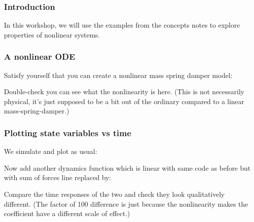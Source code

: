 \documentclass[9pt]{beamer-control}
\begin{document}

\begin{frame}
  \frametitle{Introduction}
  In this workshop, we will use the examples from the concepts notes to explore properties of nonlinear systems.
\end{frame}


\begin{frame}
  \frametitle{A nonlinear ODE}

  Satisfy yourself that you can create a nonlinear mass spring damper model:


  Double-check you can see what the nonlinearity is here. (This is not necessarily physical, it's just supposed to be a bit out of the ordinary compared to a linear mass-spring-damper.)

\end{frame}

\begin{frame}
  \frametitle{Plotting state variables vs time}
  We simulate and plot as usual:


  Now add another dynamics function which is linear with same code as before but with sum of forces line replaced by:


  Compare the time responses of the two and check they look qualitatively different. (The factor of 100 difference is just because the nonlinearity makes the coefficient have a different scale of effect.)

\end{frame}
\end{document}
